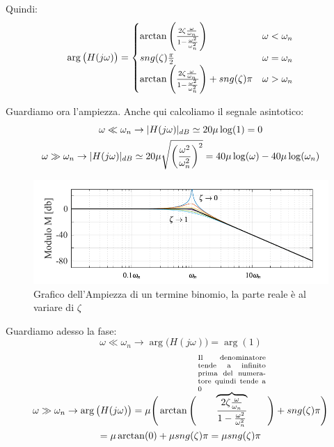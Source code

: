 Quindi:
\[ 
 	\arg\big(H(j\omega)\big) = 
 	\begin{cases}
	 	\arctan\Bigg(\frac{2\zeta\frac{\omega}{\omega_n}}{1-\frac{\omega^2}{\omega^{2}_{n}}}\Bigg) & \omega < \omega_n\\
	 	sng(\zeta)\frac{\pi}{2} &	\omega = \omega_n\\
	 	\arctan\Bigg(\frac{2\zeta\frac{\omega}{\omega_n}}{1-\frac{\omega^2}{\omega^{2}_{n}}}\Bigg)+ sng(\zeta)\pi & \omega > \omega_n\\
 	\end{cases}
\]
  
Guardiamo ora l'ampiezza. Anche qui calcoliamo il segnale asintotico:
\begin{gather*}
  	\omega \ll \omega_n \rightarrow \lvert H(j\omega)\rvert_{dB}\simeq 20\mu \log(1) = 0\\
  	\omega \gg \omega_n \rightarrow \lvert H(j\omega)\rvert_{dB}\simeq 20\mu \sqrt{	\bigg(\frac{\omega^2}{\omega^2_n}\bigg)^2} = 40\mu \log(\omega)-40 \mu \log(\omega_n)
\end{gather*}

\begin{figure}[H]
	\centering
	\includegraphics[width=0.8\linewidth]{immagini/cap6_Bode/bodeBin-amp.pdf}
	\caption{Grafico dell'Ampiezza di un termine binomio, la parte reale è al variare di $ \zeta $}
	\label{fig:bodeBin-Amp}
\end{figure}

Guardiamo adesso la fase:
\begin{equation*}
	\omega \ll \omega_n \rightarrow \arg \big(H(j\omega)\big) = \arg(1)
\end{equation*}
\begin{multline*}
	\omega \gg \omega_n \rightarrow \arg \big(H(j\omega)\big) = \mu \Bigg(\arctan\Bigg(\overbrace{\frac{2\zeta\frac{\omega}{\omega_n}}{1-\frac{\omega^2}{\omega^{2}_{n}}}}^{\parbox{7
			em}{\scriptsize Il denominatore tende a infinito prima del numeratore quindi tende a 0}}\Bigg)+ \sng(\zeta)\pi\Bigg) \\= \mu \arctan(0) + \mu \sng(\zeta)\pi = \mu \sng(\zeta)\pi
\end{multline*}


